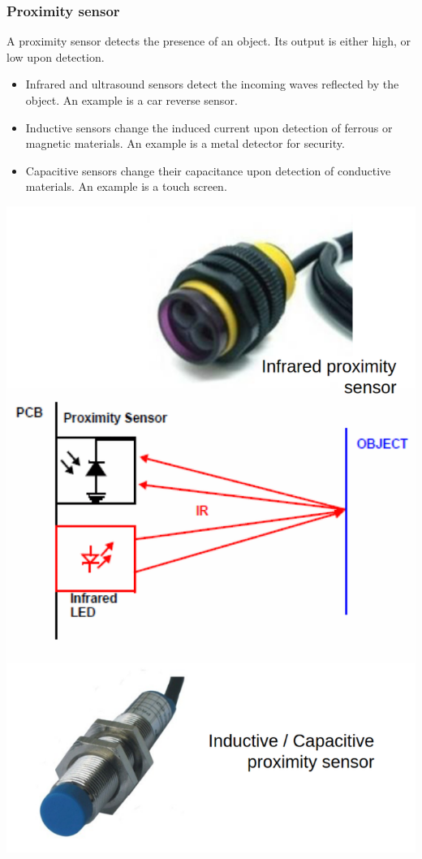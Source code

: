 \documentclass[11pt]{article}
\begin{document}
 \newpage

\subsubsection{Proximity sensor}
\label{sec:orgbe51686}
A proximity sensor detects the presence of an object. Its output is either high, or low upon detection.
\begin{itemize}
\item Infrared and ultrasound sensors detect the incoming waves reflected by the object. An example is a car reverse sensor.
\item Inductive sensors change the induced current upon detection of ferrous or magnetic materials. An example is a metal detector for security.
\item Capacitive sensors change their capacitance upon detection of conductive materials. An example is a touch screen.
\end{itemize}

\begin{center}
\includegraphics[scale=0.7]{./images/proximity-sensors.png}
\end{center}
\end{document}

